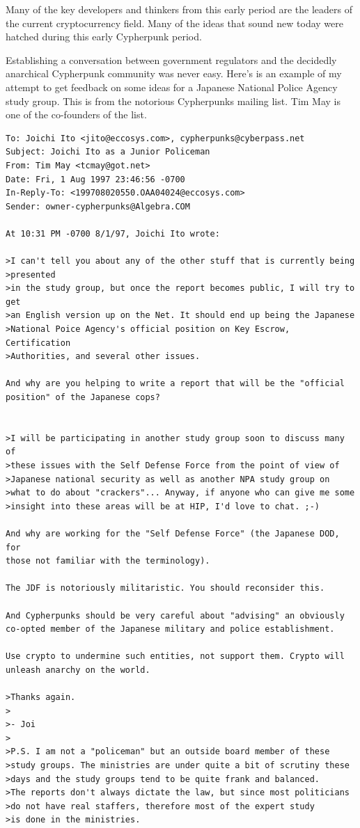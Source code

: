 Many of the key developers and thinkers from this early period are the leaders of the current cryptocurrency field. Many of the ideas that sound new today were hatched during this early Cypherpunk period.

Establishing a conversation between government regulators and the decidedly anarchical Cypherpunk community was never easy. Here's is an example of my attempt to get feedback on some ideas for a Japanese National Police Agency study group. This is from the notorious Cypherpunks mailing list. Tim May is one of the co-founders of the list.

\begin{verbatim}To: Joichi Ito <jito@eccosys.com>, cypherpunks@cyberpass.net
Subject: Joichi Ito as a Junior Policeman
From: Tim May <tcmay@got.net>
Date: Fri, 1 Aug 1997 23:46:56 -0700
In-Reply-To: <199708020550.OAA04024@eccosys.com>
Sender: owner-cypherpunks@Algebra.COM

At 10:31 PM -0700 8/1/97, Joichi Ito wrote:

>I can't tell you about any of the other stuff that is currently being
>presented
>in the study group, but once the report becomes public, I will try to get
>an English version up on the Net. It should end up being the Japanese
>National Poice Agency's official position on Key Escrow, Certification
>Authorities, and several other issues.

And why are you helping to write a report that will be the "official
position" of the Japanese cops?


>I will be participating in another study group soon to discuss many of
>these issues with the Self Defense Force from the point of view of
>Japanese national security as well as another NPA study group on
>what to do about "crackers"... Anyway, if anyone who can give me some
>insight into these areas will be at HIP, I'd love to chat. ;-)

And why are working for the "Self Defense Force" (the Japanese DOD, for
those not familiar with the terminology).

The JDF is notoriously militaristic. You should reconsider this.

And Cypherpunks should be very careful about "advising" an obviously
co-opted member of the Japanese military and police establishment.

Use crypto to undermine such entities, not support them. Crypto will
unleash anarchy on the world.

>Thanks again.
>
>- Joi
>
>P.S. I am not a "policeman" but an outside board member of these
>study groups. The ministries are under quite a bit of scrutiny these
>days and the study groups tend to be quite frank and balanced.
>The reports don't always dictate the law, but since most politicians
>do not have real staffers, therefore most of the expert study
>is done in the ministries.


\end{verbatim}
